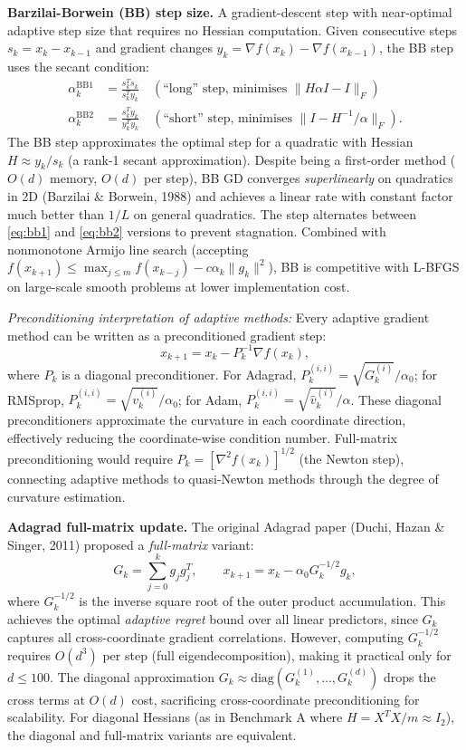 \documentclass[11pt,a4paper]{article}
\theoremstyle{definition}
\begin{document}
\noindent\textbf{Barzilai-Borwein (BB) step size.} A gradient-descent step with near-optimal adaptive step size that requires no Hessian computation. Given consecutive steps $s_k = x_k - x_{k-1}$ and gradient changes $y_k = \nabla f(x_k) - \nabla f(x_{k-1})$, the BB step uses the secant condition:
\begin{align}
\alpha_k^{\text{BB1}} &= \frac{s_k^T s_k}{s_k^T y_k} \quad (\text{``long'' step, minimises } \|H\alpha I - I\|_F) \label{eq:bb1} \\
\alpha_k^{\text{BB2}} &= \frac{s_k^T y_k}{y_k^T y_k} \quad (\text{``short'' step, minimises } \|I - H^{-1}/\alpha\|_F). \label{eq:bb2}
\end{align}
The BB step approximates the optimal step for a quadratic with Hessian $H \approx y_k/s_k$ (a rank-1 secant approximation). Despite being a first-order method ($O(d)$ memory, $O(d)$ per step), BB GD converges \emph{superlinearly} on quadratics in 2D (Barzilai \& Borwein, 1988) and achieves a linear rate with constant factor much better than $1/L$ on general quadratics. The step alternates between \eqref{eq:bb1} and \eqref{eq:bb2} versions to prevent stagnation. Combined with nonmonotone Armijo line search (accepting $f(x_{k+1}) \leq \max_{j \leq m} f(x_{k-j}) - c\alpha_k\|g_k\|^2$), BB is competitive with L-BFGS on large-scale smooth problems at lower implementation cost.

\noindent\textit{Preconditioning interpretation of adaptive methods:} Every adaptive gradient method can be written as a preconditioned gradient step:
\begin{equation}
x_{k+1} = x_k - P_k^{-1} \nabla f(x_k),
\end{equation}
where $P_k$ is a diagonal preconditioner. For Adagrad, $P_k^{(i,i)} = \sqrt{G_k^{(i)}} / \alpha_0$; for RMSprop, $P_k^{(i,i)} = \sqrt{v_k^{(i)}} / \alpha_0$; for Adam, $P_k^{(i,i)} = \sqrt{\hat{v}_k^{(i)}} / \alpha$. These diagonal preconditioners approximate the curvature in each coordinate direction, effectively reducing the coordinate-wise condition number. Full-matrix preconditioning would require $P_k = [\nabla^2 f(x_k)]^{1/2}$ (the Newton step), connecting adaptive methods to quasi-Newton methods through the degree of curvature estimation.

\noindent\textbf{Adagrad full-matrix update.} The original Adagrad paper (Duchi, Hazan \& Singer, 2011) proposed a \emph{full-matrix} variant:
\begin{equation}
G_k = \sum_{j=0}^k g_j g_j^T, \qquad x_{k+1} = x_k - \alpha_0 G_k^{-1/2} g_k,
\label{eq:adagrad_full}
\end{equation}
where $G_k^{-1/2}$ is the inverse square root of the outer product accumulation. This achieves the optimal \emph{adaptive regret} bound over all linear predictors, since $G_k$ captures all cross-coordinate gradient correlations. However, computing $G_k^{-1/2}$ requires $O(d^3)$ per step (full eigendecomposition), making it practical only for $d \leq 100$. The diagonal approximation $G_k \approx \text{diag}(G_k^{(1)}, \ldots, G_k^{(d)})$ drops the cross terms at $O(d)$ cost, sacrificing cross-coordinate preconditioning for scalability. For diagonal Hessians (as in Benchmark A where $H = X^TX/m \approx I_2$), the diagonal and full-matrix variants are equivalent.
\end{document}
